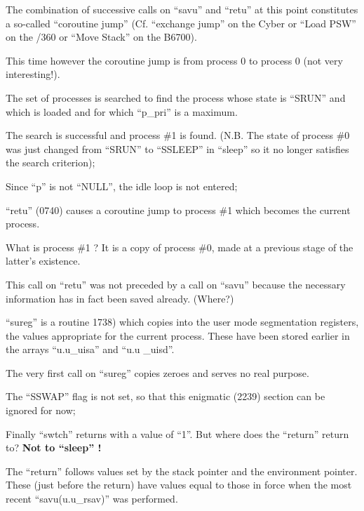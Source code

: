 The combination of successive calls on
``savu'' and ``retu'' at this point constitutes a so-called ``coroutine jump''
(Cf.
``exchange jump'' on the Cyber or ``Load
PSW'' on the /360 or ``Move Stack'' on the
B6700).

This time however the coroutine jump is
from process 0 to process 0 (not very
interesting!).

\bd
\item[2201:] The set of processes is searched
 to find the process whose state
 is ``SRUN'' and which is loaded and
 for which ``p\_pri'' is a maximum.

The search is successful and process \#1 is found. (N.B. The
state of process \#0 was just
changed from ``SRUN'' to ``SSLEEP''
in ``sleep'' so it no longer satisfies the search criterion);

\item[2218:] Since ``p'' is not ``NULL'', the idle
 loop is not entered;

\item[2228:] ``retu'' (0740) causes a coroutine
 jump to process \#1 which becomes
the current process.

What is process \#1 ? It is a copy
of process \#0, made at a previous
stage of the latter's existence.
\ed

This call on ``retu'' was not preceded by
a call on ``savu'' because the necessary
information has in fact been saved
already. (Where?)

\bd
\item[2229:] ``sureg'' is a routine 1738) which
 copies into the user mode segmentation registers, the values
 appropriate for the current process.
	These have been stored earlier in the arrays ``u.u\_uisa'' and
 ``u.u \_uisd''.
\ed

The very first call on ``sureg'' copies
zeroes and serves no real purpose.

\bd
\item[2240:] The ``SSWAP'' flag is not set, so
 that this enigmatic (2239) section can be
ignored for now;


\item[2247:] Finally ``swtch'' returns with a
 value of ``1''. But where does the ``return'' return to?
{\bf Not to ``sleep'' !}
\ed


The ``return'' follows values set by the
stack pointer and the environment
pointer. These (just before the return)
have values equal to those in force
when the most recent ``savu(u.u\_rsav)''
was performed.


